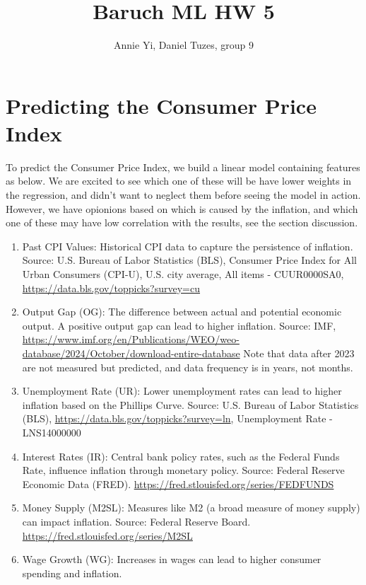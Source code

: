 \documentclass{article}
\title{Baruch ML HW 5}
\author{Annie Yi, Daniel Tuzes, group 9}
\begin{document}
\maketitle
\section*{Predicting the Consumer Price Index}
To predict the Consumer Price Index, we build a linear model containing features as below.
We are excited to see which one of these will be have lower weights in the regression,
and didn't want to neglect them before seeing the model in action.
However, we have opionions based on which is caused by the inflation,
and which one of these may have low correlation with the results,
see the section discussion.
\begin{enumerate}
      \item Past CPI Values: Historical CPI data to capture the persistence of inflation.
            Source: U.S. Bureau of Labor Statistics (BLS),
            Consumer Price Index for All Urban Consumers (CPI-U), U.S. city average, All items - CUUR0000SA0,
            \url{https://data.bls.gov/toppicks?survey=cu}
      \item Output Gap (OG): The difference between actual and potential economic output.
            A positive output gap can lead to higher inflation. Source: IMF,
            \url{https://www.imf.org/en/Publications/WEO/weo-database/2024/October/download-entire-database}
            Note that data after 2023 are not measured but predicted,
            and data frequency is in years, not months.
      \item Unemployment Rate (UR): Lower unemployment rates can lead to higher inflation based on the Phillips
            Curve. Source: U.S. Bureau of Labor Statistics (BLS), \url{https://data.bls.gov/toppicks?survey=ln},
            Unemployment Rate - LNS14000000
      \item Interest Rates (IR): Central bank policy rates, such as the Federal Funds Rate, influence inflation through
            monetary policy. Source: Federal Reserve Economic Data (FRED). \url{https://fred.stlouisfed.org/series/FEDFUNDS}
      \item Money Supply (M2SL): Measures like M2 (a broad measure of money supply) can impact inflation. Source:
            Federal Reserve Board. \url{https://fred.stlouisfed.org/series/M2SL}
      \item Wage Growth (WG): Increases in wages can lead to higher consumer spending and inflation.

\end{enumerate}
\end{document}
